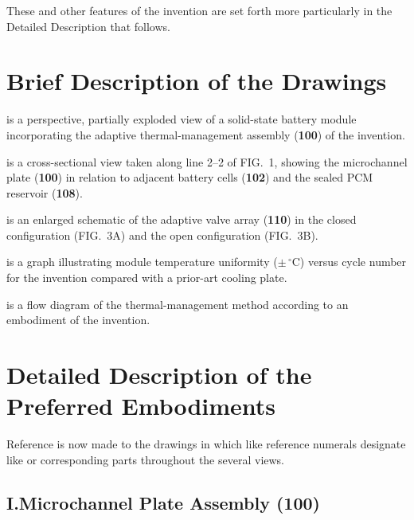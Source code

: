 \documentclass[12pt,letterpaper]{article}
\begin{document}
These and other features of the invention are set forth more particularly in the Detailed
Description that follows.

\section{Brief Description of the Drawings}

\begin{description}[leftmargin=2.2em, labelindent=0pt, itemsep=2pt]
  \item[FIG.~1] is a perspective, partially exploded view of a solid-state battery module
    incorporating the adaptive thermal-management assembly (\textbf{100}) of the invention.
  \item[FIG.~2] is a cross-sectional view taken along line 2--2 of FIG.~1, showing the
    microchannel plate (\textbf{100}) in relation to adjacent battery cells (\textbf{102})
    and the sealed PCM reservoir (\textbf{108}).
  \item[FIG.~3] is an enlarged schematic of the adaptive valve array (\textbf{110}) in the
    closed configuration (FIG.~3A) and the open configuration (FIG.~3B).
  \item[FIG.~4] is a graph illustrating module temperature uniformity ($\pm\,^{\circ}\mathrm{C}$)
    versus cycle number for the invention compared with a prior-art cooling plate.
  \item[FIG.~5] is a flow diagram of the thermal-management method according to an
    embodiment of the invention.
\end{description}

\section{Detailed Description of the Preferred Embodiments}

Reference is now made to the drawings in which like reference numerals designate like or
corresponding parts throughout the several views.

\subsection*{I.\quad Microchannel Plate Assembly (100)}
\end{document}
